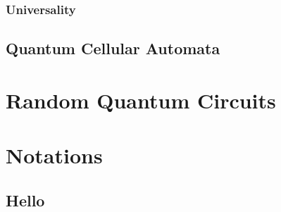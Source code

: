 \documentclass[11pt, oneside]{scrbook}
\begin{document}
\subsection{Universality} \label{ssec: universality}
\lipsum[3]

\section{Quantum Cellular Automata}
\lipsum[5-15]


\chapter{Random Quantum Circuits}

\appendix
\chapter{Notations}
\section{Hello}

\backmatter
\printbibliography[heading=bibintoc, title=Bibliography]
\end{document}
